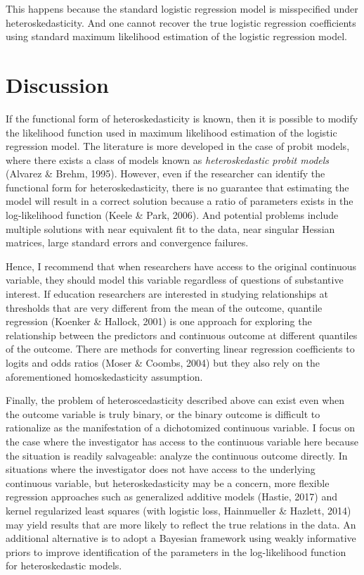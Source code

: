 \documentclass[
  english,
  doc]{apa6}
\begin{document}
This happens because the standard logistic regression model is misspecified under heteroskedasticity. And one cannot recover the true logistic regression coefficients using standard maximum likelihood estimation of the logistic regression model.

\hypertarget{discussion}{%
\section{Discussion}\label{discussion}}

If the functional form of heteroskedasticity is known, then it is possible to modify the likelihood function used in maximum likelihood estimation of the logistic regression model. The literature is more developed in the case of probit models, where there exists a class of models known as \emph{heteroskedastic probit models} (Alvarez \& Brehm, 1995). However, even if the researcher can identify the functional form for heteroskedasticity, there is no guarantee that estimating the model will result in a correct solution because a ratio of parameters exists in the log-likelihood function (Keele \& Park, 2006). And potential problems include multiple solutions with near equivalent fit to the data, near singular Hessian matrices, large standard errors and convergence failures.

Hence, I recommend that when researchers have access to the original continuous variable, they should model this variable regardless of questions of substantive interest. If education researchers are interested in studying relationships at thresholds that are very different from the mean of the outcome, quantile regression (Koenker \& Hallock, 2001) is one approach for exploring the relationship between the predictors and continuous outcome at different quantiles of the outcome. There are methods for converting linear regression coefficients to logits and odds ratios (Moser \& Coombs, 2004) but they also rely on the aforementioned homoskedasticity assumption.

Finally, the problem of heteroscedasticity described above can exist even when the outcome variable is truly binary, or the binary outcome is difficult to rationalize as the manifestation of a dichotomized continuous variable. I focus on the case where the investigator has access to the continuous variable here because the situation is readily salvageable: analyze the continuous outcome directly. In situations where the investigator does not have access to the underlying continuous variable, but heteroskedasticity may be a concern, more flexible regression approaches such as generalized additive models (Hastie, 2017) and kernel regularized least squares (with logistic loss, Hainmueller \& Hazlett, 2014) may yield results that are more likely to reflect the true relations in the data. An additional alternative is to adopt a Bayesian framework using weakly informative priors to improve identification of the parameters in the log-likelihood function for heteroskedastic models.
\end{document}
